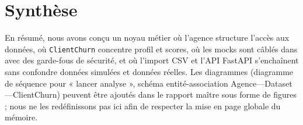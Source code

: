 \section{Synthèse}

En résumé, nous avons conçu un noyau métier où l'agence structure l'accès aux données, où \texttt{ClientChurn} concentre profil et scores, où les mocks sont câblés dans  avec des garde-fous de sécurité, et où l'import CSV et l'API FastAPI s'enchaînent sans confondre données simulées et données réelles. Les diagrammes (diagramme de séquence pour « lancer analyse », schéma entité-association Agence—Dataset—ClientChurn) peuvent être ajoutés dans le rapport maître sous forme de figures ; nous ne les redéfinissons pas ici afin de respecter la mise en page globale du mémoire.
